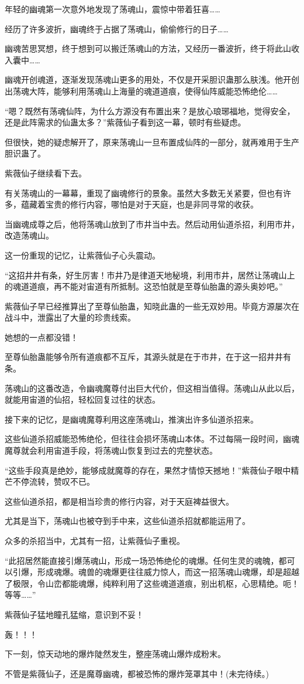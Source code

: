 \begin{this_body}
年轻的幽魂第一次意外地发现了荡魂山，震惊中带着狂喜……

经历了许多波折，幽魂终于占据了荡魂山，偷偷修行的日子……

幽魂苦思冥想，终于想到可以搬迁荡魂山的方法，又经历一番波折，终于将此山收入囊中……

幽魂开创魂道，逐渐发现荡魂山更多的用处，不仅是开采胆识蛊那么肤浅。他开创出荡魂大阵，能够利用荡魂山上海量的魂道道痕，使得仙阵威能恐怖绝伦……

“嗯？既然有荡魂仙阵，为什么方源没有布置出来？是放心琅琊福地，觉得安全，还是此阵需求的仙蛊太多？”紫薇仙子看到这一幕，顿时有些疑虑。

但很快，她的疑虑解开了，原来荡魂山一旦布置成仙阵的一部分，就再难用于生产胆识蛊了。

紫薇仙子继续看下去。

有关荡魂山的一幕幕，重现了幽魂修行的景象。虽然大多数无关紧要，但也有许多，蕴藏着宝贵的修行内容，哪怕是对于天庭，也是非同寻常的收获。

当幽魂成尊之后，他将荡魂山放到了市井当中去。然后动用仙道杀招，利用市井，改造荡魂山。

这一份重现的记忆，让紫薇仙子心头震动。

“这招井井有条，好生厉害！市井乃是律道天地秘境，利用市井，居然让荡魂山上的魂道道痕，再不能对宙道有所抵制。这恐怕就是至尊仙胎蛊的源头奥妙吧。”

紫薇仙子早已经推算出了至尊仙胎蛊，知晓此蛊的一些无双妙用。毕竟方源屡次在战斗中，泄露出了大量的珍贵线索。

她想的一点都没错！

至尊仙胎蛊能够令所有道痕都不互斥，其源头就是在于市井，在于这一招井井有条。

荡魂山的这番改造，令幽魂魔尊付出巨大代价，但这相当值得。荡魂山从此以后，就能用宙道的仙招，轻松回复过往的状态。

接下来的记忆，是幽魂魔尊利用这座荡魂山，推演出许多仙道杀招来。

这些仙道杀招威能恐怖绝伦，但往往会损坏荡魂山本体。不过每隔一段时间，幽魂魔尊就会利用宙道手段，将荡魂山恢复到过去的完整状态。

“这些手段真是绝妙，能够成就魔尊的存在，果然才情惊天撼地！”紫薇仙子眼中精芒不停流转，赞叹不已。

这些仙道杀招，都是相当珍贵的修行内容，对于天庭裨益很大。

尤其是当下，荡魂山也被夺到手中来，这些仙道杀招就都能运用了。

众多的杀招当中，尤其有一招，让紫薇仙子重视。

“此招居然能直接引爆荡魂山，形成一场恐怖绝伦的魂爆。任何生灵的魂魄，都可以引爆，形成魂爆。魂兽的魂爆更往往威力惊人，而这一招荡魂山魂爆，却是超越了极限，令山峦都能魂爆，纯粹利用了这些魂道道痕，别出机枢，心思精绝。呃！等等……”

紫薇仙子猛地瞳孔猛缩，意识到不妥！

轰！！！

下一刻，惊天动地的爆炸陡然发生，整座荡魂山爆炸成粉末。

不管是紫薇仙子，还是魔尊幽魂，都被恐怖的爆炸笼罩其中！(未完待续。)

\end{this_body}

